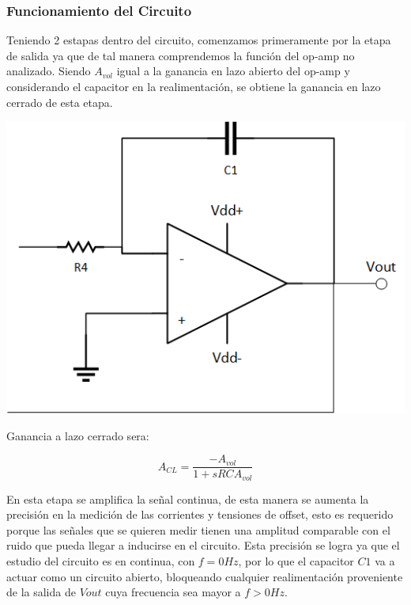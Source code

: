 \subsubsection{Funcionamiento del Circuito}

Teniendo 2 estapas dentro del circuito, comenzamos primeramente por la etapa de salida ya que de tal manera comprendemos la función del op-amp no analizado. Siendo $A_{vol}$ igual a la ganancia en lazo abierto del op-amp y considerando el capacitor en la realimentación, se obtiene la ganancia en lazo cerrado de esta etapa.

\begin{minipage}{.55\textwidth}
    \begin{center}
        \includegraphics[scale = 0.5]{etapa2.png}
        \label{ej2et1}    
    \end{center}
\end{minipage}
\begin{minipage}{0.45\textwidth}
    Ganancia a lazo cerrado sera:
    
    $$A_{CL} = \frac{-A_{vol}}{1 + sRCA_{vol}}$$
    
\end{minipage}

En esta etapa se amplifica la señal continua, de esta manera se aumenta la precisión en la medición de las corrientes y tensiones de offset, esto es requerido porque las señales que se quieren medir tienen una amplitud comparable con el ruido que pueda llegar a inducirse en el circuito. Esta precisión se logra ya que el estudio del circuito es en continua, con $f = 0Hz$, por lo que el capacitor $C1$ va a actuar como un circuito abierto, bloqueando cualquier realimentación proveniente de la salida de $Vout$ cuya frecuencia sea mayor a $f> 0Hz$.

